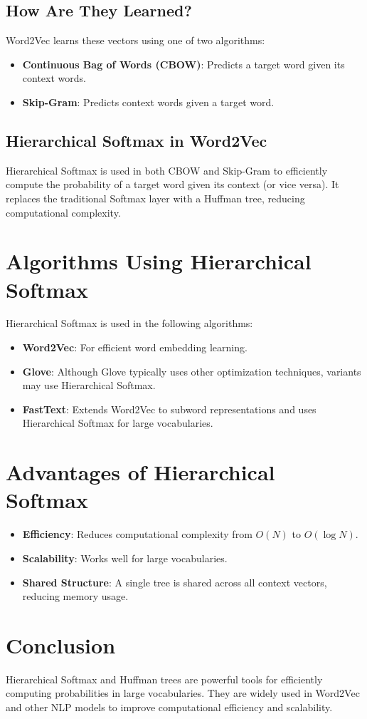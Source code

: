 \begin{notechapter}
\subsection{How Are They Learned?}
Word2Vec learns these vectors using one of two algorithms:
\begin{itemize}
    \item \textbf{Continuous Bag of Words (CBOW)}: Predicts a target
          word given its context words.
    \item \textbf{Skip-Gram}: Predicts context words given a target
          word.
\end{itemize}

\subsection{Hierarchical Softmax in Word2Vec}
Hierarchical Softmax is used in both CBOW and Skip-Gram to
efficiently compute the probability of a target word given
its context (or vice versa). It replaces the traditional
Softmax layer with a Huffman tree, reducing computational
complexity.

\section{Algorithms Using Hierarchical Softmax}
Hierarchical Softmax is used in the following algorithms:
\begin{itemize}
    \item \textbf{Word2Vec}: For efficient word embedding learning.
    \item \textbf{Glove}: Although Glove typically uses other
          optimization techniques, variants may use Hierarchical
          Softmax.
    \item \textbf{FastText}: Extends Word2Vec to subword
          representations and uses Hierarchical Softmax for
          large vocabularies.
\end{itemize}

\section{Advantages of Hierarchical Softmax}
\begin{itemize}
    \item \textbf{Efficiency}: Reduces computational complexity
          from \( O(N) \) to \( O(\log N) \).
    \item \textbf{Scalability}: Works well for large vocabularies.
    \item \textbf{Shared Structure}: A single tree is shared across
          all context vectors, reducing memory usage.
\end{itemize}

\section{Conclusion}
Hierarchical Softmax and Huffman trees are powerful tools
for efficiently computing probabilities in large vocabularies.
They are widely used in Word2Vec and other NLP models to
improve computational efficiency and scalability.
\end{notechapter}
